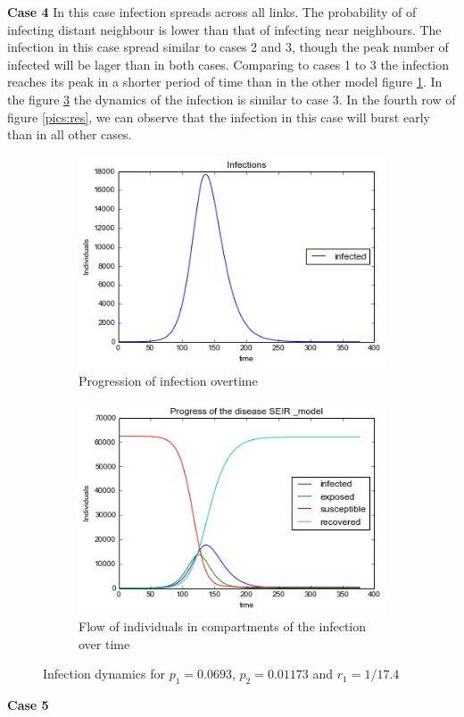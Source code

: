 \textbf{Case 4}
In this case infection spreads across all links. The probability of of infecting distant neighbour is lower than that of infecting near neighbours. The infection in this case spread similar to cases 2 and 3, though the peak number of infected will be lager than in both cases. Comparing to cases 1 to 3 the infection reaches its peak in a shorter period of time than in the other model figure \ref{a41}. In the figure \ref{a42} the dynamics of the infection is similar to case 3. In the fourth row of figure \ref{pics:res}, we can observe that the infection  in this case will burst early than in all other cases.

\begin{figure}[h!]
    \centering
    \begin{subfigure}[b]{0.45\textwidth}
        \includegraphics[width=\textwidth]{images/4infections}
        \caption{Progression of infection overtime}
        \label{a41}
    \end{subfigure}
     \begin{subfigure}[b]{0.45\textwidth}
        \includegraphics[width=\textwidth]{images/4SEIR}
        \caption{  Flow of individuals in compartments of the infection over time}
        \label{a42}
    \end{subfigure}
  \caption{Infection dynamics for $p_1 = 0.0693 $, $p_2=0.01173$ and $r_1 = 1/17.4$ }
 \end{figure}
 \newpage
 \textbf{Case 5}
 
